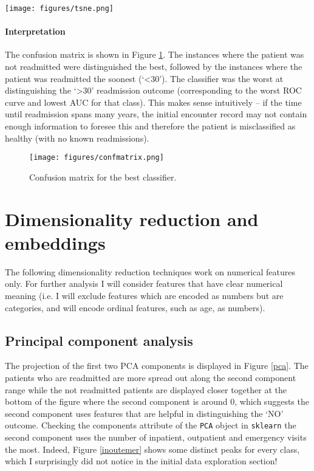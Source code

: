 \documentclass[10pt, twocolumn]{article}
\begin{document}
\begin{figure*}[b]
	\centering
	\texttt{[image: figures/tsne.png]}
	\caption{t-SNE embeddings of the diabetic patient dataset for selected perplexities.}\label{tsne}
  \end{figure*}

\paragraph{Interpretation} The confusion matrix is shown in Figure \ref{confmatrix}. The instances where the patient was not readmitted were distinguished the best, followed by the instances where the patient was readmitted the soonest (‘<30’). The classifier was the worst at distinguishing the ‘>30’ readmission outcome (corresponding to the worst ROC curve and lowest AUC for that class). This makes sense intuitively – if the time until readmission spans many years, the initial encounter record may not contain enough information to foresee this and therefore the patient is misclassified as healthy (with no known readmissions).

\begin{figure}[htb!]
	\centering
	\texttt{[image: figures/confmatrix.png]}
	\caption{Confusion matrix for the best classifier.}\label{confmatrix}
\end{figure}

\raggedbottom

\section{Dimensionality reduction and embeddings}
The following dimensionality reduction techniques work on numerical features only. For further analysis I will consider features that have clear numerical meaning (i.e. I will exclude features which are encoded as numbers but are categories, and will encode ordinal features, such as age, as numbers).


\subsection{Principal component analysis}

The projection of the first two PCA components is displayed in Figure \ref{pca}. The patients who are readmitted are more spread out along the second component range while the not readmitted patients are displayed closer together at the bottom of the figure where the second component is around 0, which suggests the second component uses features that are helpful in distinguishing the `NO' outcome. Checking the components attribute of the \texttt{PCA} object in \texttt{sklearn} the second component uses the number of inpatient, outpatient and emergency visits the most. Indeed, Figure \ref{inoutemer} shows some distinct peaks for every class, which I surprisingly did not notice in the initial data exploration section!
\end{document}
